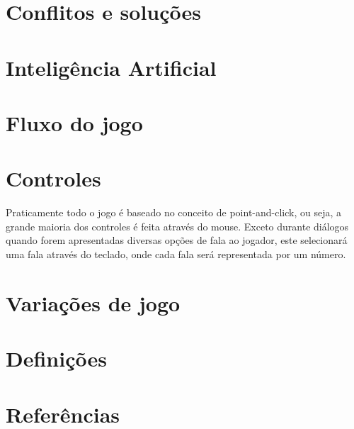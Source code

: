 
\section{Conflitos e soluções}

\section{Inteligência Artificial}

\section{Fluxo do jogo}

\section{Controles}
Praticamente todo o jogo é baseado no conceito de point-and-click, ou seja, a grande maioria dos controles é feita através do mouse. Exceto durante diálogos quando forem apresentadas diversas opções de fala ao jogador, este selecionará uma fala através do teclado, onde cada fala será representada por um número.

\section{Variações de jogo}

\section{Definições}

\section{Referências}
